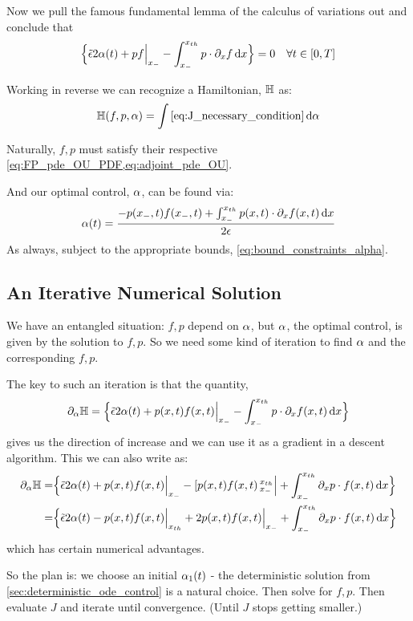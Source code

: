 \documentclass{article}
\begin{document}
Now we pull the famous fundamental lemma of the calculus of variations out and
conclude that
\begin{equation}
\Big\{
 \tilde{{\epsilon}}  2 {\alpha}(t)
+ p f \Big|_{ x_{-} }
- \int _{ x_{-} }^{ x_{th} } p \cdot {\partial}_x f \, \mathrm{d} x 
\Big\} = 0
\quad \forall t \in [0,T]
\label{eq:J_necessary_condition}
\end{equation}

Working in reverse we can recognize a Hamiltonian, ${ \mathbb{H}}$ as:
$$
\H(f,p,\a) =  \int \cref{eq:J_necessary_condition} \intd{\a} 
$$

Naturally, $f,p$ must satisfy their respective
\cref{eq:FP_pde_OU_PDF,eq:adjoint_pde_OU}.

And our optimal control, ${\alpha}$,  can be found via:
\begin{equation}
{\alpha} (t) = \frac { - p({ x_{-} },t) f({ x_{-} },t)
+ \int _{ x_{-} }^{ x_{th} } p(x,t) \cdot {\partial}_x f(x,t) \, \mathrm{d} x 
}{2{\epsilon}}
\label{eq:optimal_alpha_4_PDF_optimization}
\end{equation}
As always, subject to the appropriate bounds, \cref{eq:bound_constraints_alpha}.

\subsection{An Iterative Numerical Solution}
We have an entangled situation: $f,p$ depend on ${\alpha}$, but ${\alpha}$, the optimal
control, is given by the solution to $f,p$. So we need some kind of iteration to
find ${\alpha}$ and the corresponding $f,p$.

The key to such an iteration is that the quantity, 
$${\partial}_{\alpha} { \mathbb{H}} =  \Big\{
 \tilde{{\epsilon}}  2 {\alpha}(t)
+ p(x,t) f(x,t) \Big|_{ x_{-} }
- \int _{ x_{-} }^{ x_{th} } p \cdot {\partial}_x f(x,t) \, \mathrm{d} x 
\Big\}
$$ gives us the direction of increase
and we can use it as a gradient in a descent algorithm. 
This we can also write as:
\begin{align*}
{\partial}_{\alpha} { \mathbb{H}} =&  \Big\{
 \tilde{{\epsilon}}  2 {\alpha}(t)
+ p(x,t) f(x,t) \Big|_{ x_{-} }
- [p(x,t) f(x,t) \, _{ x_{-} }^{ x_{th} }\Big|
+ \int _{ x_{-} }^{ x_{th} } {\partial}_x p \cdot f(x,t) \, \mathrm{d} x 
\Big\}
\\
=&
 \Big\{
 \tilde{{\epsilon}}  2 {\alpha}(t)
- p(x,t) f(x,t)\Big|_{ x_{th} }
+ 2p(x,t) f(x,t) \Big|_{ x_{-} }
+ \int _{ x_{-} }^{ x_{th} } {\partial}_x p \cdot f(x,t) \, \mathrm{d} x 
\Big\}
\end{align*}
which has certain numerical advantages.



So the plan is: we choose an initial ${\alpha}_1(t)$ - the deterministic solution
from \cref{sec:deterministic_ode_control} is a natural choice. Then solve for $f,p$.
Then evaluate $J$ and iterate until convergence. (Until $J$ stops getting smaller.)
\end{document}
